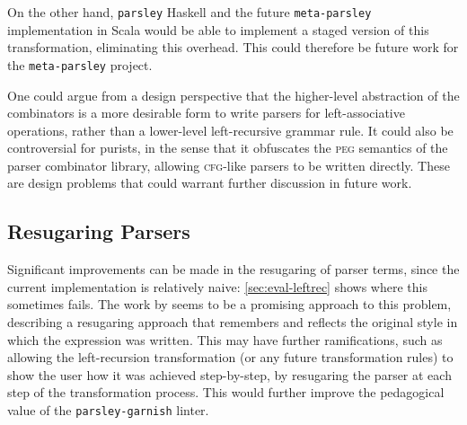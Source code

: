 \documentclass[../../main.tex]{subfiles}
\begin{document}
On the other hand, \texttt{parsley} Haskell and the future \texttt{meta-parsley} implementation in Scala would be able to implement a staged version of this transformation, eliminating this overhead.
This could therefore be future work for the \texttt{meta-parsley} project.

One could argue from a design perspective that the higher-level abstraction of the  combinators is a more desirable form to write parsers for left-associative operations, rather than a lower-level left-recursive grammar rule.
It could also be controversial for purists, in the sense that it obfuscates the \textsc{peg} semantics of the parser combinator library, allowing \textsc{cfg}-like parsers to be written directly.
These are design problems that could warrant further discussion in future work.

\subsection{Resugaring Parsers}
Significant improvements can be made in the resugaring of parser terms, since the current implementation is relatively naive: \cref{sec:eval-leftrec} shows where this sometimes fails.
The work by \textcite{pombrio_hygienic_2015} seems to be a promising approach to this problem, describing a resugaring approach that remembers and reflects the original style in which the expression was written.
This may have further ramifications, such as allowing the left-recursion transformation (or any future transformation rules) to show the user how it was achieved step-by-step, by resugaring the parser at each step of the transformation process.
This would further improve the pedagogical value of the \texttt{parsley-garnish} linter.
\end{document}
